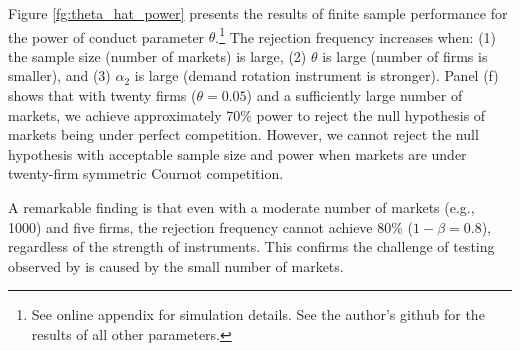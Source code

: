 \documentclass[11pt, a4paper]{article}
\begin{document}
Figure \ref{fg:theta_hat_power} presents the results of finite sample performance for the power of conduct parameter $\theta$.\footnote{See online appendix for simulation details. See the author's github for the results of all other parameters.} The rejection frequency increases when: (1) the sample size (number of markets) is large, (2) $\theta$ is large (number of firms is smaller), and (3) $\alpha_2$ is large (demand rotation instrument is stronger). Panel (f) shows that with twenty firms ($\theta=0.05$) and a sufficiently large number of markets, we achieve approximately 70\% power to reject the null hypothesis of markets being under perfect competition. However, we cannot reject the null hypothesis with acceptable sample size and power when markets are under twenty-firm symmetric Cournot competition.

A remarkable finding is that even with a moderate number of markets (e.g., 1000) and five firms, the rejection frequency cannot achieve 80\% ($1-\beta=0.8$), regardless of the strength of instruments. This confirms the challenge of testing observed by \cite{genesove1998testing} is caused by the small number of markets.
\end{document}
